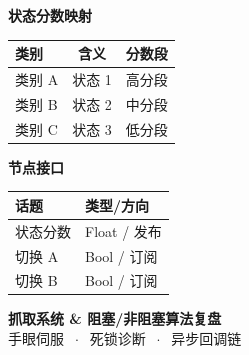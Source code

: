 \documentclass[landscape,11pt]{article}
\begin{document}
\vspace{8pt}

\begin{minipage}[t]{0.48\textwidth}
\centering
{\normalsize\bfseries 状态分数映射}

\vspace{4pt}
\begin{tabular}{lcc}
\toprule
\textbf{类别} & \textbf{含义} & \textbf{分数段} \\
\midrule
类别 A & 状态 1 & 高分段 \\
类别 B & 状态 2 & 中分段 \\
类别 C & 状态 3 & 低分段 \\
\bottomrule
\end{tabular}
\end{minipage}
\hfill
\begin{minipage}[t]{0.48\textwidth}
\centering
{\normalsize\bfseries 节点接口}

\vspace{4pt}
\begin{tabular}{ll}
\toprule
\textbf{话题} & \textbf{类型/方向} \\
\midrule
状态分数    & Float / 发布 \\
切换 A      & Bool / 订阅 \\
切换 B      & Bool / 订阅 \\
\bottomrule
\end{tabular}
\end{minipage}

\newpage


\begin{center}
{\LARGE\bfseries\textcolor{mainblue}{抓取系统 \& 阻塞/非阻塞算法复盘}}\\[3pt]
{\large\textcolor{black!50}{手眼伺服 $\;\cdot\;$ 死锁诊断 $\;\cdot\;$ 异步回调链}}
\end{center}

\vspace{6pt}
\end{document}

